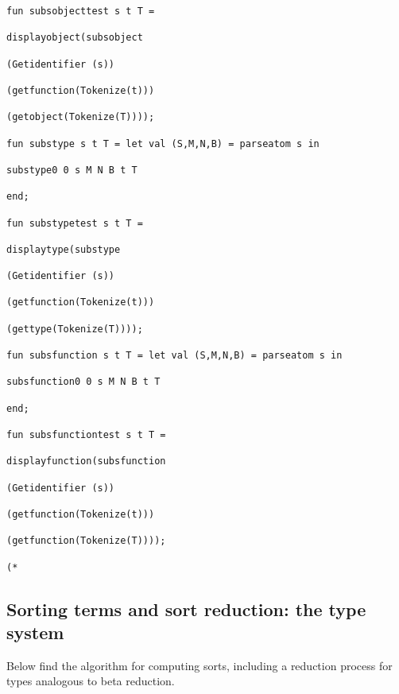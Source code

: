\documentclass[12pt]{article}
\begin{document}
\begin{verbatim}
fun subsobjecttest s t T =

displayobject(subsobject

(Getidentifier (s))

(getfunction(Tokenize(t)))

(getobject(Tokenize(T))));

fun substype s t T = let val (S,M,N,B) = parseatom s in

substype0 0 s M N B t T

end;

fun substypetest s t T =

displaytype(substype

(Getidentifier (s))

(getfunction(Tokenize(t)))

(gettype(Tokenize(T))));

fun subsfunction s t T = let val (S,M,N,B) = parseatom s in

subsfunction0 0 s M N B t T

end;

fun subsfunctiontest s t T =

displayfunction(subsfunction

(Getidentifier (s))

(getfunction(Tokenize(t)))

(getfunction(Tokenize(T))));

(*

\end{verbatim}

\newpage

\subsection{Sorting terms and sort reduction:  the type system}

Below find the algorithm for computing sorts, including a reduction process for types
analogous to beta reduction.
\end{document}
